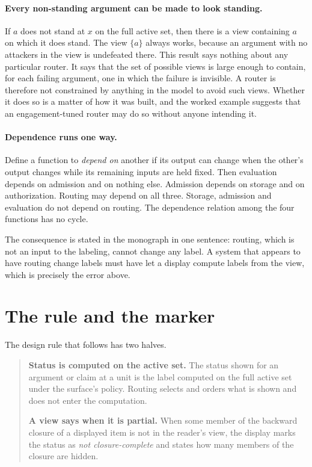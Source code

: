 \documentclass[11pt]{article}
\begin{document}
\paragraph{Every non-standing argument can be made to look standing.} If $a$ does not stand at $x$ on the full active set, then there is a view containing $a$ on which it does stand. The view $\{a\}$ always works, because an argument with no attackers in the view is undefeated there. This result says nothing about any particular router. It says that the set of possible views is large enough to contain, for each failing argument, one in which the failure is invisible. A router is therefore not constrained by anything in the model to avoid such views. Whether it does so is a matter of how it was built, and the worked example suggests that an engagement-tuned router may do so without anyone intending it.

\paragraph{Dependence runs one way.} Define a function to \emph{depend on} another if its output can change when the other's output changes while its remaining inputs are held fixed. Then evaluation depends on admission and on nothing else. Admission depends on storage and on authorization. Routing may depend on all three. Storage, admission and evaluation do not depend on routing. The dependence relation among the four functions has no cycle.

The consequence is stated in the monograph in one sentence: routing, which is not an input to the labeling, cannot change any label. A system that appears to have routing change labels must have let a display compute labels from the view, which is precisely the error above.

\section{The rule and the marker}\label{sec:rule}

The design rule that follows has two halves.

\begin{quote}
\textbf{Status is computed on the active set.} The status shown for an argument or claim at a unit is the label computed on the full active set under the surface's policy. Routing selects and orders what is shown and does not enter the computation.

\textbf{A view says when it is partial.} When some member of the backward closure of a displayed item is not in the reader's view, the display marks the status as \emph{not closure-complete} and states how many members of the closure are hidden.
\end{quote}
\end{document}

